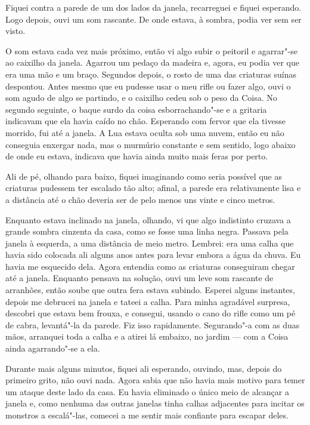 Fiquei contra a parede de um dos lados da janela, recarreguei e fiquei esperando. Logo depois, ouvi um som rascante. De
onde estava, à sombra, podia ver sem ser visto.

O som estava cada vez mais próximo, então vi algo subir o peitoril e agarrar"-se ao caixilho da janela. Agarrou um
pedaço da madeira e, agora, eu podia ver que era uma mão e um braço. Segundos depois, o rosto de uma das criaturas
suínas despontou. Antes mesmo que eu pudesse usar o meu rifle ou fazer algo, ouvi o som agudo de algo se
partindo, e o caixilho cedeu sob o peso da Coisa. No segundo seguinte, o baque surdo da coisa esborrachando"-se e a
gritaria indicavam que ela havia caído no chão. Esperando com fervor que ela tivesse morrido, fui até a janela. A
Lua estava oculta sob uma nuvem, então eu não conseguia enxergar nada, mas o murmúrio constante e sem sentido, logo
abaixo de onde eu estava, indicava que havia ainda muito mais feras por perto.

Ali de pé, olhando para baixo, fiquei imaginando como seria possível que as criaturas pudessem ter escalado tão alto;
afinal, a parede era relativamente lisa e a distância até o chão deveria ser de pelo menos uns vinte e cinco metros.

Enquanto estava inclinado na janela, olhando, vi que algo indistinto cruzava a grande sombra cinzenta da casa,
como se fosse uma linha negra. Passava pela janela à esquerda, a uma distância de meio metro. Lembrei: era uma calha
que havia sido colocada ali alguns anos antes para levar embora a água da chuva. Eu havia me esquecido dela. Agora
entendia como as criaturas conseguiram chegar até a janela. Enquanto pensava na solução, ouvi um leve som rascante de
arranhões, então soube que outra fera estava subindo. Esperei alguns instantes, depois me debrucei na janela e tateei
a calha. Para minha agradável surpresa, descobri que estava bem frouxa, e consegui, usando o cano do rifle como um
pé de cabra, levantá"-la da parede. Fiz isso rapidamente. Segurando"-a com as duas mãos, arranquei toda a
calha e a atirei lá embaixo, no jardim --- com a Coisa ainda agarrando"-se a ela.

Durante mais alguns minutos, fiquei ali esperando, ouvindo, mas, depois do primeiro grito, não ouvi nada. Agora sabia
que não havia mais motivo para temer um ataque deste lado da casa. Eu havia eliminado o único meio de alcançar a janela
e, como nenhuma das outras janelas tinha calhas adjacentes para incitar os monstros a escalá"-las, comecei a me sentir mais
confiante para escapar deles.

